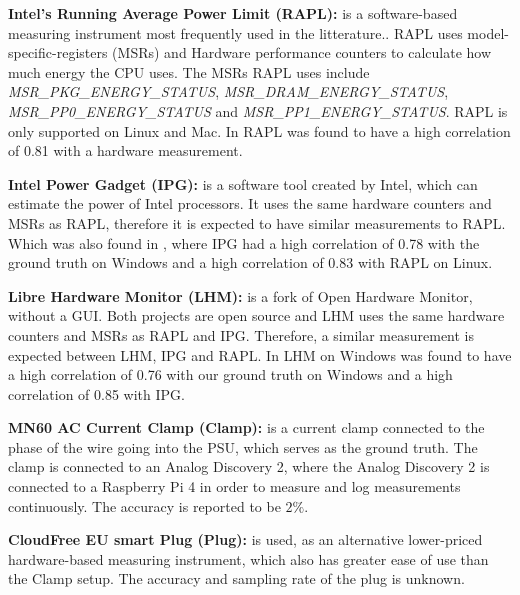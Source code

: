 \noindent\textbf{Intel's Running Average Power Limit (RAPL):} is a software-based measuring instrument most frequently used in the litterature.\cite{biksbois}. RAPL uses model-specific-registers (MSRs) and Hardware performance counters to calculate how much energy the CPU uses. The MSRs RAPL uses include \textit{MSR\_PKG\_ENERGY\_STATUS}, \textit{MSR\_DRAM\_ENERGY\_STATUS}, \textit{MSR\_PP0\_ENERGY\_STATUS} and \textit{MSR\_PP1\_ENERGY\_STATUS}. %
RAPL is only supported on Linux and Mac. In \cite{biksbois} RAPL was found to have a high correlation of 0.81 with a hardware measurement.\cite{biksbois}\newline

\noindent\textbf{Intel Power Gadget (IPG):} is a software tool created by Intel, which can estimate the power of Intel processors. %
It uses the same hardware counters and MSRs as RAPL\cite{FireFox}, therefore it is expected to have similar measurements to RAPL. Which was also found in \cite{biksbois}, where IPG had a high correlation of 0.78 with the ground truth on Windows and a high correlation of 0.83 with RAPL on Linux.\cite{biksbois}\newline





\noindent\textbf{Libre Hardware Monitor (LHM):} is a fork of Open Hardware Monitor, without a GUI.\cite{LHM} Both projects are open source and LHM uses the same hardware counters and MSRs as RAPL and IPG. %
Therefore, a similar measurement is expected between LHM, IPG and RAPL. In \cite{biksbois} LHM on Windows was found to have a high correlation of 0.76 with our ground truth on Windows and a high correlation of 0.85 with IPG.\newline

\noindent\textbf{MN60 AC Current Clamp (Clamp):} is a current clamp connected to the phase of the wire going into the PSU, which serves as the ground truth. The clamp is connected to an Analog Discovery 2, where the Analog Discovery 2 is connected to a Raspberry Pi 4 in order to measure and log measurements continuously.\cite{biksbois} The accuracy is reported to be $2\%$\cite{ClampDoc}.\newline

\noindent\textbf{CloudFree EU smart Plug (Plug):} is used, as an alternative lower-priced hardware-based measuring instrument, which also has greater ease of use than the Clamp setup. The accuracy and sampling rate of the plug is unknown.\cite{CloudFreeEUSMartPlug}\newline